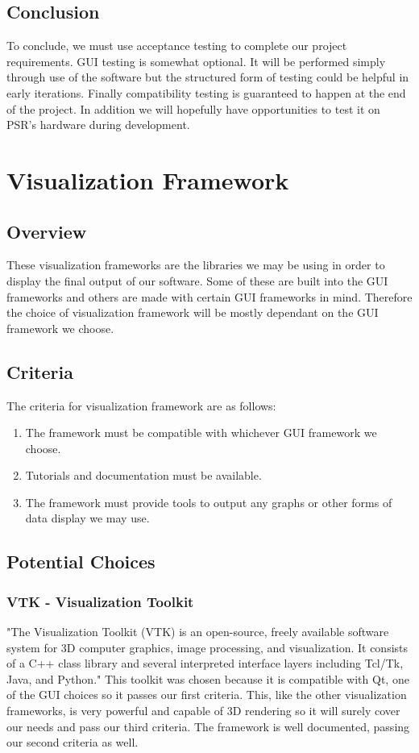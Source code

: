 \documentclass[onecolumn, draftclsnofoot,10pt, compsoc]{IEEEtran}
\begin{document}
\subsection{Conclusion}
To conclude, we must use acceptance testing to complete our project requirements. 
GUI testing is somewhat optional. 
It will be performed simply through use of the software but the structured form of testing could be helpful in early iterations. 
Finally compatibility testing is guaranteed to happen at the end of the project. 
In addition we will hopefully have opportunities to test it on PSR's hardware during development.



\section{Visualization Framework}

\subsection{Overview}
These visualization frameworks are the libraries we may be using in order to display the final output of our software. 
Some of these are built into the GUI frameworks and others are made with certain GUI frameworks in mind. 
Therefore the choice of visualization framework will be mostly dependant on the GUI framework we choose.

\subsection{Criteria}
The criteria for visualization framework are as follows:
\begin{enumerate}
    \item The framework must be compatible with whichever GUI framework we choose.
    \item Tutorials and documentation must be available.
    \item The framework must provide tools to output any graphs or other forms of data display we may use.
\end{enumerate}

\subsection{Potential Choices}

\subsubsection{VTK - Visualization Toolkit}
"The Visualization Toolkit (VTK) is an open-source, freely available software system for 3D computer graphics, image processing, and visualization. It consists of a C++ class library and several interpreted interface layers including Tcl/Tk, Java, and Python." \cite{vtk} This toolkit was chosen because it is compatible with Qt, one of the GUI choices so it passes our first criteria. This, like the other visualization frameworks, is very powerful and capable of 3D rendering so it will surely cover our needs and pass our third criteria. The framework is well documented, passing our second criteria as well.
\end{document}
